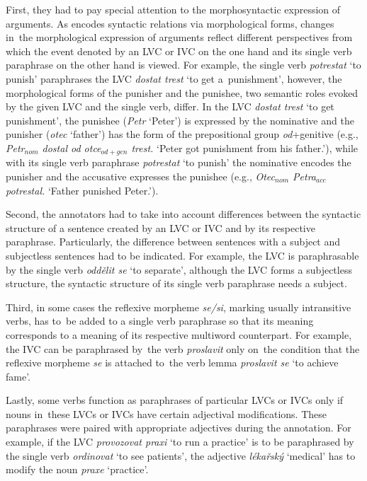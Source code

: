 \documentclass[output=paper,modfonts,nonflat]{langsci/langscibook}
\begin{document}
First, they had to pay special attention to the morphosyntactic expression of 
arguments. As  encodes syntactic relations via morphological forms, 
changes in~the morphological expression of arguments reflect different 
perspectives from which the event denoted by an LVC or IVC on the one hand
and its single verb paraphrase on the other hand is viewed. 
For example, the single verb \textit{potrestat} `to punish' paraphrases 
the LVC \textit{dostat trest} `to get a~punishment', however, 
the morphological forms of the punisher and the punishee, two semantic roles 
evoked by the given LVC and the single verb, differ. In the LVC \textit{dostat 
trest} `to get punishment', the punishee (\textit{Petr} `Peter') is expressed 
by the nominative and the punisher (\textit{otec} `father') 
has the form of the prepositional group \textit{od}+genitive
(e.g., \textit{Petr$_{nom}$ dostal od otce$_{od+gen}$ trest.} `Peter got punishment from his father.'), while with its single verb paraphrase \textit{potrestat} `to punish'
the nominative encodes the punisher and the accusative expresses the punishee (e.g., \textit{Otec$_{nom}$ Petra$_{acc}$ potrestal.} `Father punished Peter.').

Second, the annotators had to take into account differences between the 
syntactic structure of a sentence created by an LVC or IVC and by its respective 
paraphrase. 
Particularly, the difference between sentences with a subject and subjectless 
sentences had to be indicated. For example, the LVC  is paraphrasable by 
the single verb \textit{oddělit se} `to separate', although the LVC forms a 
subjectless structure, the syntactic structure of its single verb paraphrase 
needs a subject. 

Third, in some cases the reflexive morpheme \textit{se/si}, marking usually 
intransitive verbs, has to~be added to a single verb paraphrase so that its 
meaning corresponds to a meaning of its respective multiword counterpart.
For example, the IVC  can be paraphrased by~the verb \textit{proslavit} only on~the 
condition that the reflexive morpheme \textit{se} is attached to~the verb lemma 
\textit{proslavit se} `to achieve fame'.

Lastly, some verbs function as paraphrases of particular LVCs or IVCs only if 
nouns in~these LVCs or IVCs have certain adjectival modifications. These 
paraphrases were paired with appropriate adjectives during the annotation. 
For example, if the LVC \textit{provozovat praxi} `to run a practice' is to be 
paraphrased by the single verb \textit{ordinovat} `to see patients', 
the adjective \textit{lékařský} `medical' has to modify the noun \textit{praxe} 
`practice'. 
\end{document}
